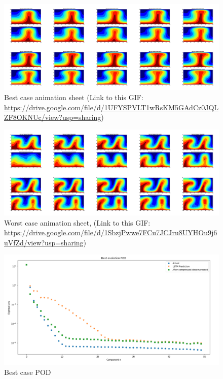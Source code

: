\begin{figure}[H]
    \centering
    \caption{Best case animation sheet (Link to this GIF: \url{https://drive.google.com/file/d/1UFYSPVLT1wRsKM5GAdCz0JQLZF8OKNUc/view?usp=sharing})}
    \includegraphics[scale=0.10]{Report LaTeX/figures/mantle_convection_images/larger_dataset/LSTM_Best_GIF_sheet.png}
\end{figure}



\begin{figure}[H]
    \centering
    \caption{Worst case animation sheet, (Link to this GIF: 
    \url{https://drive.google.com/file/d/1SbzjPwwe7FCu7JCJru8UYHOu9j6uVfZd/view?usp=sharing})}
    \includegraphics[scale=0.10]{Report LaTeX/figures/mantle_convection_images/larger_dataset/LSTM_Worst_GIF_sheet.png}
\end{figure}


\begin{figure}[H]
    \caption{Best case POD}
    \includegraphics[scale=0.5]{Report LaTeX/figures/mantle_convection_images/larger_dataset/LSTM_Best_POD.png}
\end{figure}

